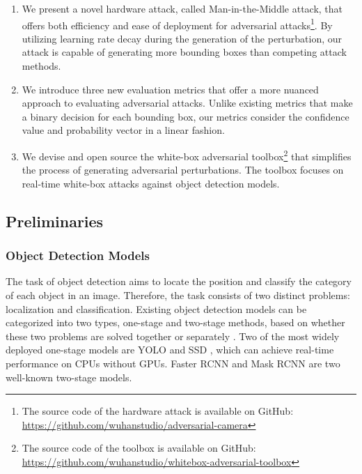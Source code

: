 \begin{enumerate}
    \item We present a novel hardware attack, called Man-in-the-Middle attack, that offers both efficiency and ease of deployment for adversarial attacks\footnote{The source code of the hardware attack is available on GitHub: \url{https://github.com/wuhanstudio/adversarial-camera}}. By utilizing learning rate decay during the generation of the perturbation, our attack is capable of generating more bounding boxes than competing attack methods.
    \item We introduce three new evaluation metrics that offer a more nuanced approach to evaluating adversarial attacks. Unlike existing metrics that make a binary decision for each bounding box, our metrics consider the confidence value and probability vector in a linear fashion.
    \item We devise and open source the white-box adversarial toolbox\footnote{The source code of the toolbox is available on GitHub: \url{https://github.com/wuhanstudio/whitebox-adversarial-toolbox}} that simplifies the process of generating adversarial perturbations. The toolbox focuses on real-time white-box attacks against object detection models. 
\end{enumerate}


\subsection{Preliminaries}


\subsubsection{Object Detection Models}

The task of object detection aims to locate the position and classify the category of each object in an image. Therefore, the task consists of two distinct problems: localization and classification. Existing object detection models can be categorized into two types, one-stage and two-stage methods, based on whether these two problems are solved together or separately \citep{Zhao2019}. Two of the most widely deployed one-stage models are YOLO \citep{redmon2016you, redmon2018yolov3, bochkovskiy2020yolov4} and SSD \citep{liu2016ssd}, which can achieve real-time performance on CPUs without GPUs. Faster RCNN \citep{ren2015faster} and Mask RCNN \citep{he2017mask} are two well-known two-stage models. 

